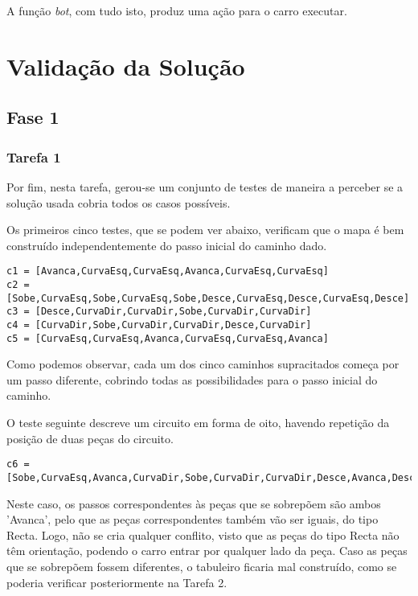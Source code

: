 \documentclass[a4paper]{report}
\begin{document}
A função \textit{bot}, com tudo isto, produz uma ação para o carro executar.

\chapter{Validação da Solução}

\section{Fase 1}

\subsection{Tarefa 1}
\label{validacaotarefa1}

Por fim, nesta tarefa, gerou-se um conjunto de testes de maneira a perceber se a solução usada cobria todos os casos possíveis.

Os primeiros cinco testes, que se podem ver abaixo, verificam que o mapa é bem construído independentemente do passo inicial do caminho dado.

\begin{verbatim}
c1 = [Avanca,CurvaEsq,CurvaEsq,Avanca,CurvaEsq,CurvaEsq]
c2 = [Sobe,CurvaEsq,Sobe,CurvaEsq,Sobe,Desce,CurvaEsq,Desce,CurvaEsq,Desce]
c3 = [Desce,CurvaDir,CurvaDir,Sobe,CurvaDir,CurvaDir]
c4 = [CurvaDir,Sobe,CurvaDir,CurvaDir,Desce,CurvaDir]
c5 = [CurvaEsq,CurvaEsq,Avanca,CurvaEsq,CurvaEsq,Avanca]
\end{verbatim}

Como podemos observar, cada um dos cinco caminhos supracitados começa por um passo diferente, cobrindo todas as possibilidades para o passo inicial do caminho.

O teste seguinte descreve um circuito em forma de oito, havendo repetição da posição de duas peças do circuito.

\begin{lstlisting}
c6 = [Sobe,CurvaEsq,Avanca,CurvaDir,Sobe,CurvaDir,CurvaDir,Desce,Avanca,Desce,CurvaEsq,CurvaEsq]
\end{lstlisting}

Neste caso, os passos correspondentes às peças que se sobrepõem são ambos 'Avanca', pelo que as peças correspondentes também vão ser iguais, do tipo Recta. Logo, não se cria qualquer conflito, visto que as peças do tipo Recta não têm orientação, podendo o carro entrar por qualquer lado da peça. Caso as peças que se sobrepõem fossem diferentes, o tabuleiro ficaria mal construído, como se poderia verificar posteriormente na Tarefa 2.
\end{document}
